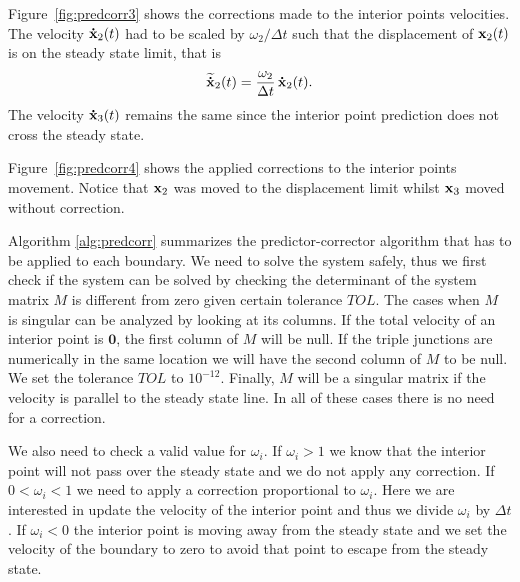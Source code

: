 Figure~\ref{fig:predcorr3} shows the corrections made to the interior points velocities. The velocity $\dotx_2(t)$ had to be scaled by $\omega_2 / \Delta t$ such that the displacement of $\x_2(t)$ is on the steady state limit, that is
\begin{equation*}
\widetilde{\dotx}_2(t) = \frac{\omega_2}{\Delta t}\,\dotx_2(t).     
\end{equation*}
The velocity $\dotx_3(t)$ remains the same since the interior point prediction does not cross the steady state.

Figure~\ref{fig:predcorr4} shows the applied corrections to the interior points movement. Notice that $\x_2$ was moved to the displacement limit whilst $\x_3$ moved without correction.

Algorithm \ref{alg:predcorr} summarizes the predictor-corrector algorithm that has to be applied to each boundary. 
We need to solve the system safely, thus we first check if the system can be solved by checking the determinant of the system matrix $M$ is different from zero given certain tolerance $TOL$. 
The cases when $M$ is singular can be analyzed by looking at its columns. 
If the total velocity of an interior point is $\mathbf{0}$, the first column of $M$ will be null.
If the triple junctions are numerically in the same location we will have the second column of $M$ to be null. 
We set the tolerance $TOL$ to $10^{-12}$. Finally, $M$ will be a singular matrix if the velocity is parallel to the steady state line. In all of these cases there is no need for a correction.

We also need to check a valid value for $\omega_i$. If $\omega_i > 1$ we know that the interior point will not pass over the steady state and we do not apply any correction. 
If $0 < \omega_i < 1$ we need to apply a correction proportional to $\omega_i$. 
Here we are interested in update the velocity of the interior point and thus we divide $\omega_i$ by $\Delta t$. 
If $\omega_i < 0$ the interior point is moving away from the steady state and we set the velocity of the boundary to zero to avoid that point to escape from the steady state.

